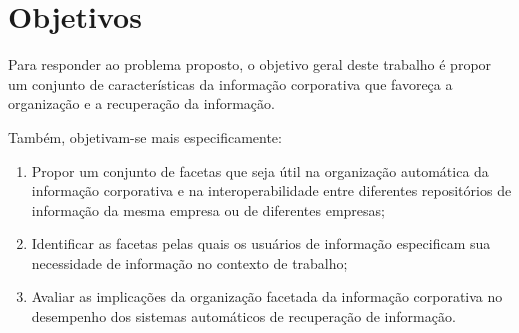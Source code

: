 




\section{Objetivos}

Para responder ao problema proposto, o objetivo geral deste trabalho é propor um conjunto de características da informação corporativa que favoreça a organização e a recuperação da informação.


Também, objetivam-se mais especificamente:

\begin{enumerate}
	\item Propor um conjunto de facetas que seja útil na organização automática da informação corporativa e na interoperabilidade entre diferentes repositórios de informação da mesma empresa ou de diferentes empresas;

	\item Identificar as facetas pelas quais os usuários de informação especificam sua necessidade de informação no contexto de trabalho;

	\item Avaliar as implicações da organização facetada da informação corporativa no desempenho dos sistemas automáticos de recuperação de informação.

\end{enumerate}

